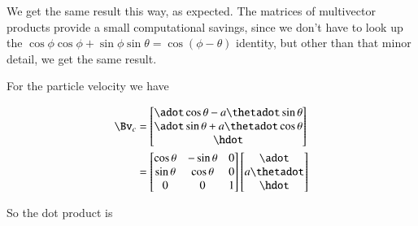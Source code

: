We get the same result this way, as expected.  The matrices of multivector products provide a small computational savings, since we don't have to look up the $\cos\phi \cos\phi + \sin\phi \sin\theta = \cos(\phi - \theta)$ identity, but other than that minor detail, we get the same result.

For the particle velocity we have

\begin{align*}
\Bv_c 
&= 
\begin{bmatrix}
\adot \cos\theta - a \thetadot \sin\theta \\
\adot \sin\theta + a \thetadot \cos\theta \\
\hdot 
\end{bmatrix} \\
&=
\begin{bmatrix}
\cos\theta & - \sin\theta & 0 \\
\sin\theta & \cos\theta & 0 \\
0 & 0 & 1
\end{bmatrix} 
\begin{bmatrix}
\adot \\
a \thetadot  \\
\hdot 
\end{bmatrix}
\end{align*}

So the dot product is 

